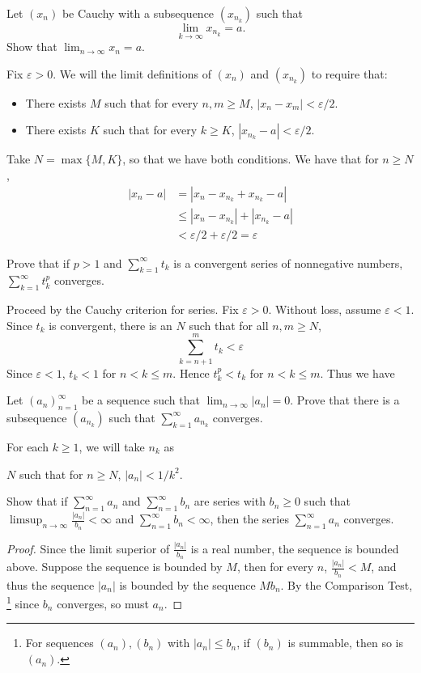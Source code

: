 \documentclass[../main.tex]{subfiles}
\begin{document}
\begin{problem}[\S2.8 A]
Let $(x_n)$ be Cauchy with a subsequence $(x_{n_k})$ such that
\[
	\lim_{k \to \infty} x_{n_k} = a.
\]
Show that $\lim_{n \to \infty} x_n = a$.
\end{problem}
Fix $\varepsilon > 0$.
We will the limit definitions of $(x_n)$ and $(x_{n_k})$ to require that:
\begin{itemize}
	\item There exists $M$ such that for every $n, m \ge M$, $|x_n - x_m| < \varepsilon/2$.
	\item There exists $K$ such that for every $k \ge K$, $|x_{n_k} - a| < \varepsilon/2$.
\end{itemize}
Take $N = \max\{ M, K \}$, so that we have both conditions.
We have that for $n \ge N$,
\begin{align*}
	|x_n - a|
	 & = |x_n - x_{n_k} + x_{n_k} - a|               \\
	 & \le |x_n - x_{n_k}| + |x_{n_k} - a|           \\
	 & < \varepsilon/2 + \varepsilon/2 = \varepsilon
\end{align*}

\begin{problem}[\S3.1 C]
Prove that if $p > 1$ and $\sum_{k = 1}^\infty t_k$ is a convergent series of nonnegative numbers, $\sum_{k = 1}^\infty t_k^p$ converges.
\end{problem}
Proceed by the Cauchy criterion for series.
Fix $\varepsilon > 0$.
Without loss, assume $\varepsilon < 1$.
Since $t_k$ is convergent, there is an $N$ such that for all $n, m \ge N$,
\[
	\sum_{k = n + 1}^m t_k < \varepsilon
\]
Since $\varepsilon < 1$, $t_k < 1$ for $n < k \le m$.
Hence $t_k^p < t_k$ for $n < k \le m$.
Thus we have

\begin{problem}[\S3.1 D]
Let $(a_n)_{n = 1}^\infty$ be a sequence such that $\lim_{n \to \infty} |a_n| = 0$.
Prove that there is a subsequence $(a_{n_k})$ such that $\sum_{k = 1}^\infty a_{n_k}$ converges.
\end{problem}
For each $k \ge 1$, we will take $n_k$ as

$N$ such that for $n \ge N$, $|a_{n}| < 1/k^2$.

\begin{problem}[\S3.2 H]
Show that if $\sum_{n = 1}^\infty a_n$ and $\sum_{n = 1}^\infty b_n$ are series with $b_n \ge 0$ such that $\limsup_{n \to \infty} \frac{|a_n|}{b_n} < \infty$ and $\sum_{n = 1}^\infty b_n < \infty$, then the series $\sum_{n = 1}^\infty a_n$ converges.
\end{problem}

\begin{proof}
	Since the limit superior of $\frac{|a_n|}{b_n}$ is a real number, the sequence is bounded above.
	Suppose the sequence is bounded by $M$, then for every $n$, $\frac{|a_n|}{b_n} < M$, and thus the sequence $|a_n|$ is bounded by the sequence $M b_n$.
	By the Comparison Test,
	\footnote{For sequences $(a_n), (b_n)$ with $|a_n| \le b_n$, if $(b_n)$ is summable, then so is $(a_n)$.}
	since $b_n$ converges, so must $a_n$.
\end{proof}
\end{document}
